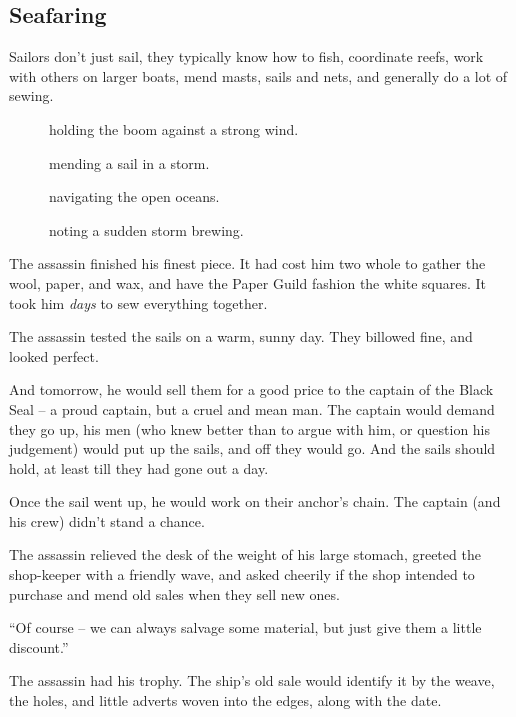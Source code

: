 \begin{multicols}{2}
\begin{exampletext}
\end{exampletext}

\subsection{Seafaring}

Sailors don't just sail, they typically know how to fish, coordinate reefs, work with others on larger boats, mend masts, sails and nets, and generally do a lot of sewing.

\begin{description}
  \item[]
    holding the boom against a strong wind.
  \item[]
    mending a sail in a storm.
  \item[]
    navigating the open oceans.
  \item[]
    noting a sudden storm brewing.
\end{description}

\begin{exampletext}
  The assassin finished his finest piece.
  It had cost him two whole  to gather the wool, paper, and wax, and have the Paper Guild fashion the white squares.
  It took him \emph{days} to sew everything together.

  The assassin tested the sails on a warm, sunny day.
  They billowed fine, and looked perfect.

  And tomorrow, he would sell them for a good price to the captain of the Black Seal -- a proud captain, but a cruel and mean man.
  The captain would demand they go up, his men (who knew better than to argue with him, or question his judgement) would put up the sails, and off they would go.
  And the sails should hold, at least till they had gone out a day.

  Once the sail went up, he would work on their anchor's chain.
  The captain (and his crew) didn't stand a chance.

  The assassin relieved the desk of the weight of his large stomach, greeted the shop-keeper with a friendly wave, and asked cheerily if the shop intended to purchase and mend old sales when they sell new ones.

  ``Of course -- we can always salvage some material, but just give them a little discount.''

  The assassin had his trophy.
  The ship's old sale would identify it by the weave, the holes, and little adverts woven into the edges, along with the date.


\end{exampletext}
\end{multicols}
